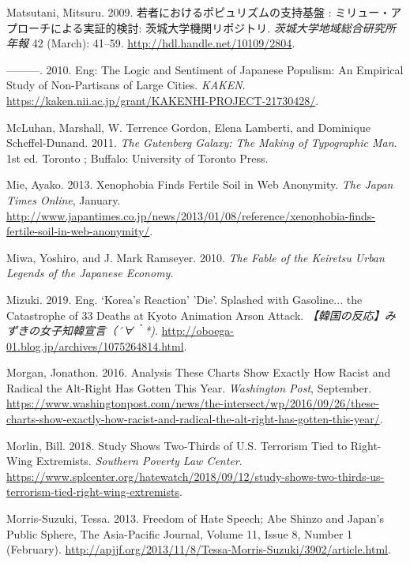 \documentclass[10pt,british,A4paper,,openany]{memoir}
\begin{document}
\hypertarget{ref-matsutani__2009}{}
Matsutani, Mitsuru. 2009. 若者におけるポピュリズムの支持基盤 :
ミリュー・アプローチによる実証的検討: 茨城大学機関リポジトリ.
\emph{茨城大学地域総合研究所年報} 42 (March): 41--59.
\url{http://hdl.handle.net/10109/2804}.

\hypertarget{ref-matsutani_eng:_2010}{}
---------. 2010. Eng: The Logic and Sentiment of Japanese Populism: An
Empirical Study of Non-Partisans of Large Cities. \emph{KAKEN}.
\url{https://kaken.nii.ac.jp/grant/KAKENHI-PROJECT-21730428/}.

\hypertarget{ref-mcluhan_gutenberg_2011}{}
McLuhan, Marshall, W. Terrence Gordon, Elena Lamberti, and Dominique
Scheffel-Dunand. 2011. \emph{The Gutenberg Galaxy: The Making of
Typographic Man}. 1st ed. Toronto ; Buffalo: University of Toronto
Press.

\hypertarget{ref-mie_xenophobia_2013}{}
Mie, Ayako. 2013. Xenophobia Finds Fertile Soil in Web Anonymity.
\emph{The Japan Times Online}, January.
\url{http://www.japantimes.co.jp/news/2013/01/08/reference/xenophobia-finds-fertile-soil-in-web-anonymity/}.

\hypertarget{ref-miwa_fable_2010}{}
Miwa, Yoshiro, and J. Mark Ramseyer. 2010. \emph{The Fable of the
Keiretsu Urban Legends of the Japanese Economy}.

\hypertarget{ref-mizuki_eng._2019}{}
Mizuki. 2019. Eng. `Korea's Reaction' 'Die'. Splashed with Gasoline...
the Catastrophe of 33 Deaths at Kyoto Animation Arson Attack.
\emph{【韓国の反応】みずきの女子知韓宣言（´∀｀*)}.
\url{http://oboega-01.blog.jp/archives/1075264814.html}.

\hypertarget{ref-morgan_analysis_2016}{}
Morgan, Jonathon. 2016. Analysis These Charts Show Exactly How Racist
and Radical the Alt-Right Has Gotten This Year. \emph{Washington Post},
September.
\url{https://www.washingtonpost.com/news/the-intersect/wp/2016/09/26/these-charts-show-exactly-how-racist-and-radical-the-alt-right-has-gotten-this-year/}.

\hypertarget{ref-morlin_study_2018}{}
Morlin, Bill. 2018. Study Shows Two-Thirds of U.S. Terrorism Tied to
Right-Wing Extremists. \emph{Southern Poverty Law Center}.
\url{https://www.splcenter.org/hatewatch/2018/09/12/study-shows-two-thirds-us-terrorism-tied-right-wing-extremists}.

\hypertarget{ref-morris-suzuki_freedom_2013}{}
Morris-Suzuki, Tessa. 2013. Freedom of Hate Speech; Abe Shinzo and
Japan's Public Sphere, The Asia-Pacific Journal, Volume 11, Issue 8,
Number 1 (February).
\url{http://apjjf.org/2013/11/8/Tessa-Morris-Suzuki/3902/article.html}.
\end{document}
